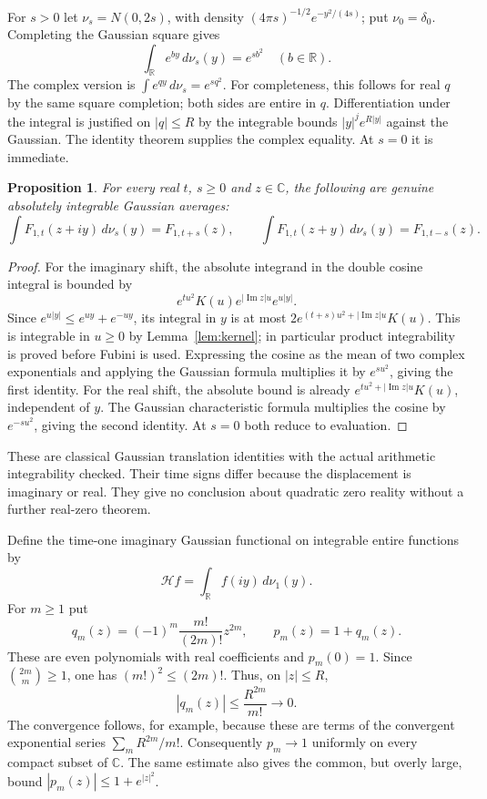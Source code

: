 \documentclass[11pt]{article}
\newtheorem{proposition}[theorem]{Proposition}
\theoremstyle{remark}\newtheorem{remark}[theorem]{Remark}
\newcommand{\R}{\mathbb R}\newcommand{\C}{\mathbb C}
\begin{document}
For $s>0$ let $\nu_s=N(0,2s)$, with density
$(4\pi s)^{-1/2}e^{-y^2/(4s)}$; put $\nu_0=\delta_0$.
Completing the Gaussian square gives
\[
 \int_{\R} e^{by}\,d\nu_s(y)=e^{sb^2}\quad(b\in\R).
\]
The complex version is $\int e^{qy}\,d\nu_s=e^{sq^2}$.
For completeness, this follows for real $q$ by the same square
completion; both sides are entire in $q$. Differentiation under the
integral is justified on $|q|\leq R$ by the integrable bounds
$|y|^j e^{R|y|}$ against the Gaussian. The identity theorem supplies
the complex equality. At $s=0$ it is immediate.

\begin{proposition}\label{prop:gaussiantranslate}
For every real $t$, $s\geq0$ and $z\in\C$, the following are
genuine absolutely integrable Gaussian averages:
\begin{equation}\label{eq:actualgaussian}
 \int F_{1,t}(z+iy)\,d\nu_s(y)=F_{1,t+s}(z),\qquad
 \int F_{1,t}(z+y)\,d\nu_s(y)=F_{1,t-s}(z).
\end{equation}
\end{proposition}
\begin{proof}
For the imaginary shift, the absolute integrand in the double
cosine integral is bounded by
\[
 e^{tu^2}K(u)e^{|\operatorname{Im}z|u}e^{u|y|}.
\]
Since $e^{u|y|}\leq e^{uy}+e^{-uy}$, its integral in $y$ is at
most $2e^{(t+s)u^2+|\operatorname{Im}z|u}K(u)$. This is integrable
in $u\geq0$ by Lemma~\ref{lem:kernel}; in particular product
integrability is proved before Fubini is used. Expressing the cosine
as the mean of two complex exponentials and applying the Gaussian
formula multiplies it by $e^{su^2}$, giving the first identity.
For the real shift, the absolute bound is already
$e^{tu^2+|\operatorname{Im}z|u}K(u)$, independent of $y$.
The Gaussian characteristic formula multiplies the cosine by
$e^{-su^2}$, giving the second identity. At $s=0$ both reduce
to evaluation.
\end{proof}
These are classical Gaussian translation identities with the actual
arithmetic integrability checked. Their time signs differ because
the displacement is imaginary or real. They give no conclusion
about quadratic zero reality without a further real-zero theorem.

Define the time-one imaginary Gaussian functional on integrable
entire functions by
\[
 \mathcal H f=\int_{\R}f(iy)\,d\nu_1(y).
\]
For $m\geq1$ put
\begin{equation}\label{eq:heatpolynomials}
 q_m(z)=(-1)^m\frac{m!}{(2m)!}z^{2m},\qquad p_m(z)=1+q_m(z).
\end{equation}
These are even polynomials with real coefficients and $p_m(0)=1$.
Since $\binom{2m}{m}\geq1$, one has $(m!)^2\leq(2m)!$.
Thus, on $|z|\leq R$,
\[
 |q_m(z)|\leq\frac{R^{2m}}{m!}\longrightarrow0.
\]
The convergence follows, for example, because these are terms of
the convergent exponential series $\sum_mR^{2m}/m!$.
Consequently $p_m\to1$ uniformly on every compact subset of $\C$.
The same estimate also gives the common, but overly large, bound
$|p_m(z)|\leq1+e^{|z|^2}$.
\end{document}
